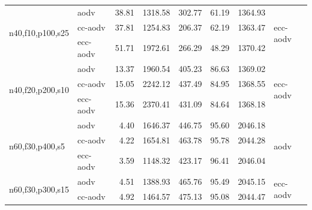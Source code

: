 \documentclass[11pt,a4paper]{article}
\begin{document}
\begin{table}[h]
\begin{tabular}{l l r r r r r l}
\midrule
\multirow{3}{*}{n40,f10,p100,s25}
 & aodv     & 38.81                       & 1318.58                       & 302.77                       & 61.19                       & 1364.93                       & \multirow{3}{*}{ecc-aodv} \\
 & cc-aodv  & 37.81                       & 1254.83                       & \cellcolor{lightgreen}206.37 & 62.19                       & \cellcolor{lightgreen}1363.47 & \\
 & ecc-aodv & \cellcolor{lightgreen}51.71 & \cellcolor{lightgreen}1972.61 & 266.29                       & \cellcolor{lightgreen}48.29 & 1370.42                       & \\
\midrule
\multirow{3}{*}{n40,f20,p200,s10}
 & aodv     & 13.37                       & 1960.54                       & \cellcolor{lightgreen}405.23 & 86.63                       & 1369.02                       & \multirow{3}{*}{ecc-aodv} \\
 & cc-aodv  & 15.05                       & 2242.12                       & 437.49                       & 84.95                       & 1368.55                       & \\
 & ecc-aodv & \cellcolor{lightgreen}15.36 & \cellcolor{lightgreen}2370.41 & 431.09                       & \cellcolor{lightgreen}84.64 & \cellcolor{lightgreen}1368.18 & \\
\midrule
\multirow{3}{*}{n60,f30,p400,s5}
 & aodv     & \cellcolor{lightgreen}4.40  & 1646.37                       & 446.75                       & \cellcolor{lightgreen}95.60 & 2046.18                       & \multirow{3}{*}{aodv} \\
 & cc-aodv  & 4.22                        & \cellcolor{lightgreen}1654.81 & 463.78                       & 95.78                       & \cellcolor{lightgreen}2044.28 & \\
 & ecc-aodv & 3.59                        & 1148.32                       & \cellcolor{lightgreen}423.17 & 96.41                       & 2046.04                       & \\
\midrule
\multirow{3}{*}{n60,f30,p300,s15}
 & aodv     & 4.51                        & 1388.93                       & 465.76                       & 95.49                       & 2045.15                       & \multirow{3}{*}{ecc-aodv} \\
 & cc-aodv  & 4.92                        & 1464.57                       & 475.13                       & 95.08                       & \cellcolor{lightgreen}2044.47 & \\

\end{tabular}
\end{table}
\end{document}
